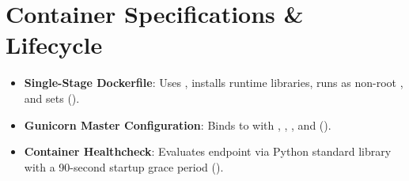 \section{Container Specifications \& Lifecycle}
\begin{itemize}[leftmargin=6mm,itemsep=1.5mm]
    \item \textbf{Single-Stage Dockerfile}: Uses , installs  runtime libraries, runs as non-root , and sets  ().
    \item \textbf{Gunicorn Master Configuration}: Binds to  with , , , and  ().
    \item \textbf{Container Healthcheck}: Evaluates endpoint  via Python standard library  with a 90-second startup grace period ().
\end{itemize}
